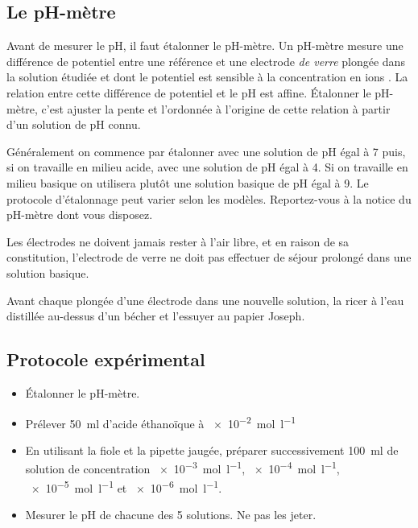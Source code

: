 \documentclass{tp}
\begin{document}
\subsection{Le pH-mètre}%
\label{sub:phmetre}
Avant de mesurer le pH, il faut étalonner le pH-mètre. Un pH-mètre mesure une différence de potentiel entre une référence et une electrode \emph{de verre} plongée dans la solution étudiée et dont le potentiel est sensible à la concentration en ions . La relation entre cette différence de potentiel et le pH est affine. 
Étalonner le pH-mètre, c'est ajuster la pente et l'ordonnée à l'origine de cette relation à partir d'un solution de pH connu.

Généralement on commence par étalonner avec une solution de pH égal à 7 puis, si on travaille en milieu acide, avec une solution de pH égal à 4. Si on travaille en milieu basique on utilisera plutôt une solution basique de pH égal à 9. Le protocole d'étalonnage peut varier selon les modèles. Reportez-vous à la notice du pH-mètre dont vous disposez.

Les électrodes ne doivent jamais rester à l'air libre, et en raison de sa constitution, l'electrode de verre ne doit pas effectuer de séjour prolongé dans une solution basique.

Avant chaque plongée d'une électrode dans une nouvelle solution, la ricer à l'eau distillée au-dessus d'un bécher et l'essuyer au papier Joseph.

\subsection{Protocole expérimental}%
\label{sub:protocole_experimental}

\begin{itemize}
  \item Étalonner le pH-mètre.

  \item Prélever \SI{50}{\milli\litre} d'acide éthanoïque à \SI{e-2}{\mol\per\litre}

  \item En utilisant la fiole et la pipette jaugée, préparer successivement \SI{100}{\milli\litre} de solution de concentration \SI{e-3}{\mol\per\litre}, \SI{e-4}{\mol\per\litre}, \SI{e-5}{\mol\per\litre} et \SI{e-6}{\mol\per\litre}.

  \item Mesurer le pH de chacune des 5 solutions. Ne pas les jeter.
\end{itemize}
\end{document}
